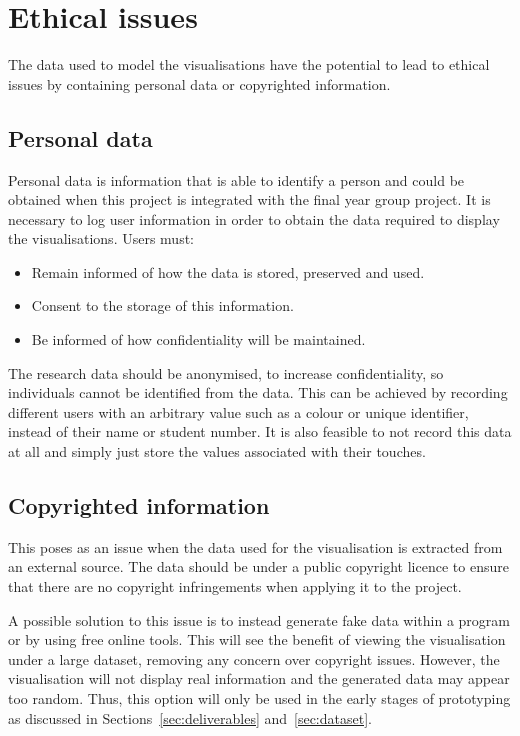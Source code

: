 \documentclass[
	fontsize=11pt
	headlines=2,
	footlines=2,
	parskip=half
]{scrartcl}
\begin{document}
	\section{Ethical issues} {
	\label{sec:ethical_issues}
		
		The data used to model the visualisations have the potential to lead to ethical issues by containing personal data or copyrighted information.
		
		\subsection{Personal data} {
		\label{sec:personal_data}
		
			Personal data is information that is able to identify a person and could be obtained when this project is integrated with the final year group project. It is necessary to log user information in order to obtain the data required to display the visualisations. Users must:
			
			\begin{itemize}
				\item Remain informed of how the data is stored, preserved and used. 
				\item Consent to the storage of this information.
				\item Be informed of how confidentiality will be maintained.
			\end{itemize}
			
			The research data should be anonymised, to increase confidentiality, so individuals cannot be identified from the data. This can be achieved by recording different users with an arbitrary value such as a colour or unique identifier, instead of their name or student number. It is also feasible to not record this data at all and simply just store the values associated with their touches.
		
		}
		
		\subsection{Copyrighted information} {
		\label{sec:copyright}
		
			This poses as an issue when the data used for the visualisation is extracted from an external source. The data should be under a public copyright licence to ensure that there are no copyright infringements when applying it to the project.
			
			A possible solution to this issue is to instead generate fake data within a program or by using free online tools. This will see the benefit of viewing the visualisation under a large dataset, removing any concern over copyright issues. However, the visualisation will not display real information and the generated data may appear too random. Thus, this option will only be used in the early stages of prototyping as discussed in Sections~\ref{sec:deliverables} and~\ref{sec:dataset}.
		
		}
	
	}
\end{document}
